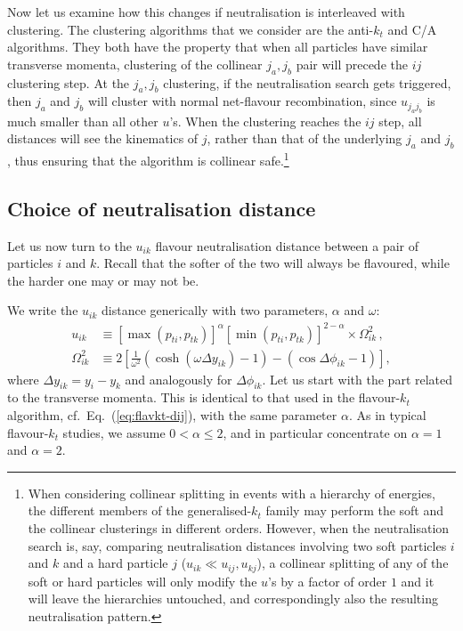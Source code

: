 \documentclass[nofootinbib,twocolumn,preprintnumbers,superscriptaddress,aps]{revtex4-2}
\begin{document}
Now let us examine how this changes if neutralisation is interleaved
with clustering.
%
The clustering algorithms that we consider are the
%
anti-$k_t$ and C/A algorithms.
%
They both have the property that when all
particles have similar transverse momenta, clustering of the collinear
$j_a,j_b$ pair will precede the $ij$ clustering step.
%
At the $j_a,j_b$ clustering, if the neutralisation search gets
triggered, then $j_a$ and $j_b$ will cluster with normal net-flavour
recombination, since $u_{j_a j_b}$ is much smaller than all other
$u$'s.
%
When the clustering reaches the $ij$ step, all distances will see the
kinematics of $j$, rather than that of the underlying $j_a$ and $j_b$,
thus ensuring that the algorithm is collinear safe.\footnote{When
  considering collinear splitting in events with a hierarchy of
  energies, the different members of the generalised-$k_t$ family may
  perform the soft and the collinear clusterings in different orders.
  However, when the neutralisation search is, say, comparing neutralisation
  distances involving two soft particles $i$ and $k$ and a hard
  particle $j$ ($u_{ik} \ll u_{ij},u_{kj}$), a collinear splitting of
  any of the soft or hard particles will only modify the $u$'s by a
  factor of order $1$ and it will leave the hierarchies untouched, and
  correspondingly also the resulting neutralisation pattern.
}


\subsection{Choice of neutralisation distance}
\label{sec:neutralisation-distance-choice}

Let us now turn to the $u_{ik}$ flavour neutralisation distance
between a pair of particles $i$ and $k$.
%
Recall that the softer of the two will always be flavoured, while the
harder one may or may not be.

We write the $u_{ik}$ distance generically with two parameters, $\alpha$
and $\omega$:
\begin{subequations}
  \label{eq:uik-all}
  \begin{align}
    \label{eq:uik-gen}
    u_{ik} &\equiv
             [\max\left(p_{ti}, p_{tk}\right)]^{\alpha}
             [\min\left(p_{ti}, p_{tk}\right)]^{2-\alpha}
             \times
             \Omega_{ik}^2\,,
    \\
    \label{eq:omegaik-gen}
    \Omega_{ik}^2 &\equiv 
                    2\left[
                    \frac1{\omega^2}\left(
                    \cosh (\omega\Delta y_{ik}) -1
                    \right)
                    - \left( \cos \Delta \phi_{ik} - 1 \right)
                    \right],
  \end{align}
\end{subequations}
where $\Delta y_{ik} = y_{i}-y_{k}$ and analogously for $\Delta
\phi_{ik}$.
%
Let us start with the part related to the transverse momenta.
%
This is identical to that used in the flavour-$k_t$ algorithm, cf.\
Eq.~(\ref{eq:flavkt-dij}), with the same parameter $\alpha$.
%
As in typical flavour-$k_t$ studies, we assume
$0 < \alpha \le 2$, and in particular concentrate on $\alpha=1$ and
$\alpha=2$.
\end{document}
